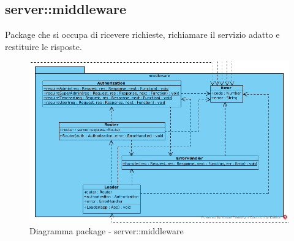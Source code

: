 \subsection{server::middleware}
Package che si occupa di ricevere richieste, richiamare il servizio adatto e restituire le risposte.\begin{center}
		\begin{figure}[H]
			\centering \includegraphics[scale=4, max width=\textwidth, max height=\myheight]{../img/diagrammiClassi/server/middleware.png}
			\caption{Diagramma package - server::middleware}
		\end{figure}
	\end{center}\hypertarget{server::middleware::Router}{}
